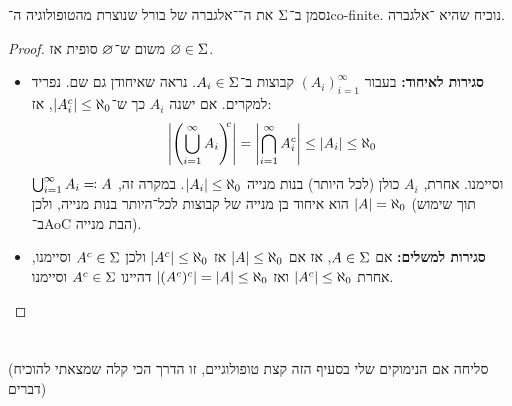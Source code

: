 \documentclass[]{../../../../tex/classes/homework}
\begin{document}
	\section{}
	נסמן ב־$\Sigma$ את ה־\ס־אלגברה של בורל שנוצרת מהטופולוגיה ה־co-finite. נוכיח שהיא \ס־אלגברה. 
	\begin{proof}
		משום ש־$\varnothing$ סופית אז $\varnothing \in \Sigma$. 
		\begin{itemize}
			\item \textbf{סגירות לאיחוד: }בעבור $(A_i)_{i = 1}^{\infty}$ קבוצות ב־$A_i \in \Sigma$. נראה שאיחודן גם שם. נפריד למקרים. אם ישנה $A_i$ כך ש־$\left \lvert A_i^{c} \right \rvert \le \aleph_0$, אז: 
			\[ \left \lvert \left ( \bigcup_{i = 1}^{\infty} A_i \right )^{\!\!c} \right \rvert = \left \lvert \bigcap_{i = 1}^{\infty} A_i^{c} \right \rvert \le \left \lvert A_i \right \rvert \le \aleph_0 \]
			וסיימנו. אחרת, $A_i$ כולן (לכל היותר) בנות מנייה $\left \lvert A_i \right \rvert \le \aleph_0$. במקרה זה, $\bigcup_{i = 1}^{\infty} A_i \eqqcolon A$ הוא איחוד בן מנייה של קבוצות לכל־היותר בנות מנייה, ולכן $\left \lvert A \right \rvert = \aleph_0$ (תוך שימוש ב־AoC הבת מנייה). 
			\item \textbf{סגירות למשלים: }אם $A \in \Sigma$, אז אם $\left \lvert A \right \rvert \le \aleph_0$ אז $\left \lvert A^{c} \right \rvert \le \aleph_0$ ולכן $A^{c} \in \Sigma$ וסיימנו, אחרת $\left \lvert A^{c} \right \rvert \le \aleph_0$ ואז $\left \lvert (A^{c})^{c} \right \rvert = \left \lvert A \right \rvert \le \aleph_0$ דהיינו $A^{c} \in \Sigma$ וסיימנו. 
		\end{itemize}
	\end{proof}
	
	\section{}
	(סליחה אם הנימוקים שלי בסעיף הזה קצת טופולוגיים, זו הדרך הכי קלה שמצאתי להוכיח דברים)
	
\end{document}
